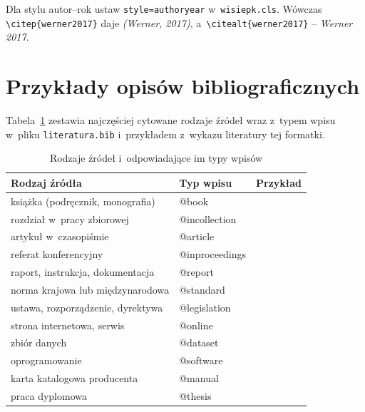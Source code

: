 Dla stylu autor--rok ustaw \texttt{style=authoryear} w~\texttt{wisiepk.cls}.
Wówczas \verb|\citep{werner2017}| daje \emph{(Werner, 2017)},
a~\verb|\citealt{werner2017}| -- \emph{Werner 2017}.

\section{Przykłady opisów bibliograficznych}
\label{sec:przyklady-bib}

Tabela~\ref{tab:typy-bib} zestawia najczęściej cytowane rodzaje źródeł
wraz z~typem wpisu w~pliku \texttt{literatura.bib} i~przykładem
z~wykazu literatury tej formatki.

\begin{table}[htbp]
  \centering
  \caption{Rodzaje źródeł i~odpowiadające im typy wpisów}
  \label{tab:typy-bib}
  \begin{tabularx}{\linewidth}{@{}>{\raggedright\arraybackslash}X
                                   >{\ttfamily}l c@{}}
    \toprule
    \textbf{Rodzaj źródła} & \textbf{\normalfont\bfseries Typ wpisu} & \textbf{Przykład} \\
    \midrule
    książka (podręcznik, monografia)       & @book          & \cite{pelech2009,duffie2013,metcalf2014} \\
    rozdział w~pracy zbiorowej             & @incollection  & \cite{nuorkivi2016} \\
    artykuł w~czasopiśmie                  & @article       & \cite{lund2014,werner2017} \\
    referat konferencyjny                  & @inproceedings & \cite{crawley2005} \\
    raport, instrukcja, dokumentacja       & @report        & \cite{iea2022,epanet22} \\
    norma krajowa lub międzynarodowa       & @standard      & \cite{pn12831,pn6946,pn14001,iso52000} \\
    ustawa, rozporządzenie, dyrektywa      & @legislation   & \cite{ustawaPOS,rozpWT,epbd2024} \\
    strona internetowa, serwis             & @online        & \cite{pvgis,tlm,isap} \\
    zbiór danych                           & @dataset       & \cite{imgw} \\
    oprogramowanie                         & @software      & \cite{qgis} \\
    karta katalogowa producenta            & @manual        & \cite{katalog} \\
    praca dyplomowa                        & @thesis        & \cite{praca2024} \\
    \bottomrule
  \end{tabularx}
\end{table}

